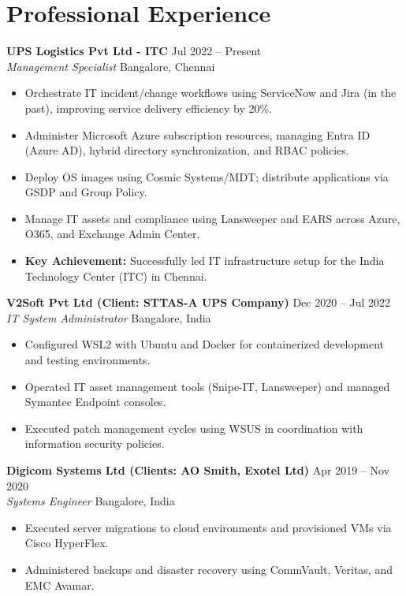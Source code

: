 \documentclass[10pt, a4paper]{article}
\begin{document}
\section{Professional Experience}

\textbf{UPS Logistics Pvt Ltd - ITC} \hfill Jul 2022 -- Present \\
\textit{Management Specialist} \hfill Bangalore, Chennai
\begin{itemize}
    \item Orchestrate IT incident/change workflows using ServiceNow and Jira (in the past), improving service delivery efficiency by 20\%.
    \item Administer Microsoft Azure subscription resources, managing Entra ID (Azure AD), hybrid directory synchronization, and RBAC policies.
    \item Deploy OS images using Cosmic Systems/MDT; distribute applications via GSDP and Group Policy.
    \item Manage IT assets and compliance using Lansweeper and EARS across Azure, O365, and Exchange Admin Center.
    \item \textbf{Key Achievement:} Successfully led IT infrastructure setup for the India Technology Center (ITC) in Chennai.
\end{itemize}

\textbf{V2Soft Pvt Ltd (Client: STTAS-A UPS Company)} \hfill Dec 2020 -- Jul 2022 \\
\textit{IT System Administrator} \hfill Bangalore, India
\begin{itemize}
    \item Configured WSL2 with Ubuntu and Docker for containerized development and testing environments.
    \item Operated IT asset management tools (Snipe-IT, Lansweeper) and managed Symantec Endpoint consoles.
    \item Executed patch management cycles using WSUS in coordination with information security policies.
\end{itemize}

\textbf{Digicom Systems Ltd (Clients: AO Smith, Exotel Ltd)} \hfill Apr 2019 -- Nov 2020 \\
\textit{Systems Engineer} \hfill Bangalore, India
\begin{itemize}
    \item Executed server migrations to cloud environments and provisioned VMs via Cisco HyperFlex.
    \item Administered backups and disaster recovery using CommVault, Veritas, and EMC Avamar.
\end{itemize}
\end{document}
